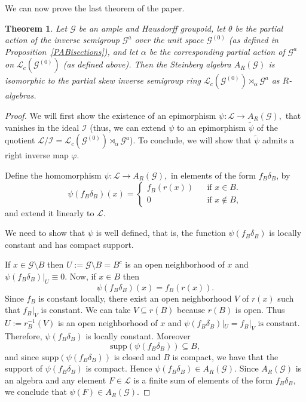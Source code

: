 \documentclass[11pt, a4paper]{amsart}
\newcommand{\G}{\ensuremath {\mathcal{G}}}
\newcommand{\Go}{\ensuremath {\mathcal{G}^{(0)}}}
\newcommand{\Ga}{\ensuremath {\mathcal{G}^{a}}}
\newcommand{\Lco}{\ensuremath {\mathcal{L}_c(\Go)}}
\newcommand{\Lgo}{\ensuremath {\mathcal{L}_c(\Go)\rtimes_{\alpha} \Ga}}
\theoremstyle{plain}
\newtheorem{theorem}{Theorem}[section]
\begin{document}
We can now prove the last theorem of the paper.

\begin{theorem}
Let $\G$ be an ample and Hausdorff groupoid, let $\theta$ be the partial action of the inverse semigroup $\Ga$ over the unit space $\Go$ (as defined in Proposition~\ref{PABisections}), and let $\alpha$ be the corresponding partial action of $\Ga$ on $\Lco$ (as defined above). Then the Steinberg algebra $A_R(\G)$ is isomorphic to the partial skew inverse semigroup ring $\Lgo$ as $R$-algebras.
\end{theorem}


\begin{proof}
We will first show the existence of an epimorphism $\psi: \mathcal{L} \rightarrow A_R(\G),$ that vanishes in the ideal $\mathcal{I}$ (thus, we can extend $\psi$ to an epimorphism $\tilde\psi$ of the quotient $\mathcal{L}/\mathcal{I}= \Lgo$). To conclude, we will show that $\tilde\psi$ admits a right inverse map $\varphi$. %

Define the homomorphism $\psi: \mathcal{L} \rightarrow A_R(\G),$ in elements of the form $f_B\delta_B$, by
$$\psi(f_B\delta_B)(x)= \left\lbrace \begin{array}{ccr}
                                      f_B(r(x)) & & \mbox{if} \,\, x \in B. \\
                                              0 & & \mbox{if} \,\, x \notin B, 
\end{array}\right.$$
and extend it linearly to $\mathcal{L}.$ 

We need to show that $\psi$ is well defined, that is, the function $\psi(f_B \delta_B)$ is locally constant and has compact support.

If $ x \in \G \setminus B$ then $U:= \G \setminus B = B^c $ is an open neighborhood of $x$ and  
  $ \psi(f_B\delta_B)|_U \equiv 0.$
Now, if $x \in B$ then  
  $$\psi(f_B\delta_B)(x)=f_B(r(x)).$$
Since $f_B$ is constant locally, there exist an open neighborhood $V$ of $r(x)$ such that $f_B|_V$ is constant. We can take $V \subseteq r(B)$ because $r(B)$ is open. Thus $U:=r_B^{-1}(V)$ is an open neighborhood of $x$ and   
  $ \psi(f_B\delta_B)|_U =f_B|_V \,\, \mbox{is constant.}$
Therefore, $ \psi(f_B\delta_B)$ is locally constant. Moreover 
  $$ \mbox{supp} ( \psi(f_B\delta_B) ) \subseteq B,$$
and since $\mbox{supp} ( \psi(f_B\delta_B)) $ is closed and $B$ is compact, we have that the support of  $ \psi(f_B\delta_B)$ is compact. Hence $\psi(f_B\delta_B) \in A_R(\G).$ 
Since $A_R(\G)$ is an algebra and any element $F\in \mathcal{L} $ is a finite sum of elements of the form $f_B\delta_B,$ we conclude that $\psi(F)\in A_R(\G).$



\end{proof}
\end{document}

